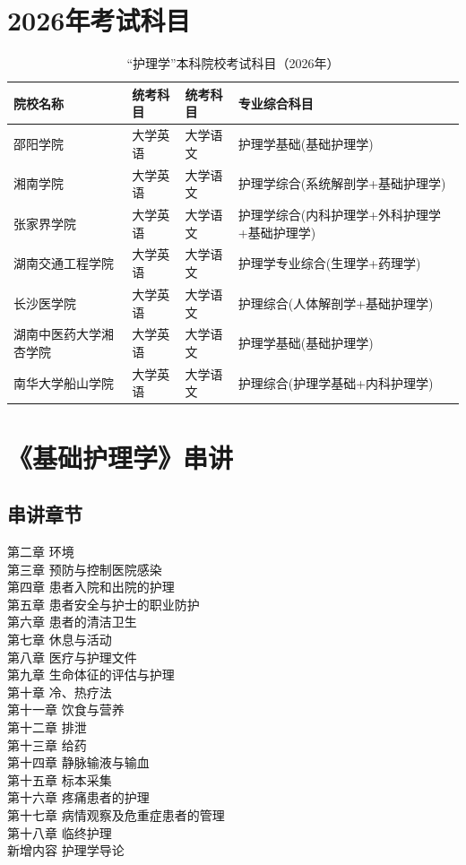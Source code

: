 \documentclass[11pt, a4paper]{ctexart}
\begin{document}
\section{2026年考试科目}
\begin{table}[htbp]
\centering
\caption{“护理学”本科院校考试科目（2026年）}
\label{tab:exam}
\small
\begin{tabular}{|l|l|l|l|}
\hline
\textbf{院校名称} & \textbf{统考科目} & \textbf{统考科目} & \textbf{专业综合科目} \\
\hline
邵阳学院 & 大学英语 & 大学语文 & 护理学基础(基础护理学) \\
湘南学院 & 大学英语 & 大学语文 & 护理学综合(系统解剖学+基础护理学) \\
张家界学院 & 大学英语 & 大学语文 & 护理学综合(内科护理学+外科护理学+基础护理学) \\
湖南交通工程学院 & 大学英语 & 大学语文 & 护理学专业综合(生理学+药理学) \\
长沙医学院 & 大学英语 & 大学语文 & 护理综合(人体解剖学+基础护理学) \\
湖南中医药大学湘杏学院 & 大学英语 & 大学语文 & 护理学基础(基础护理学) \\
南华大学船山学院 & 大学英语 & 大学语文 & 护理综合(护理学基础+内科护理学) \\
\hline
\end{tabular}
\end{table}

\section{《基础护理学》串讲}
\subsection{串讲章节}
第二章 环境 \\
第三章 预防与控制医院感染 \\
第四章 患者入院和出院的护理 \\
第五章 患者安全与护士的职业防护 \\
第六章 患者的清洁卫生 \\
第七章 休息与活动 \\
第八章 医疗与护理文件 \\
第九章 生命体征的评估与护理 \\
第十章 冷、热疗法 \\
第十一章 饮食与营养 \\
第十二章 排泄 \\
第十三章 给药 \\
第十四章 静脉输液与输血 \\
第十五章 标本采集 \\
第十六章 疼痛患者的护理 \\
第十七章 病情观察及危重症患者的管理 \\
第十八章 临终护理 \\
新增内容 护理学导论
\end{document}
